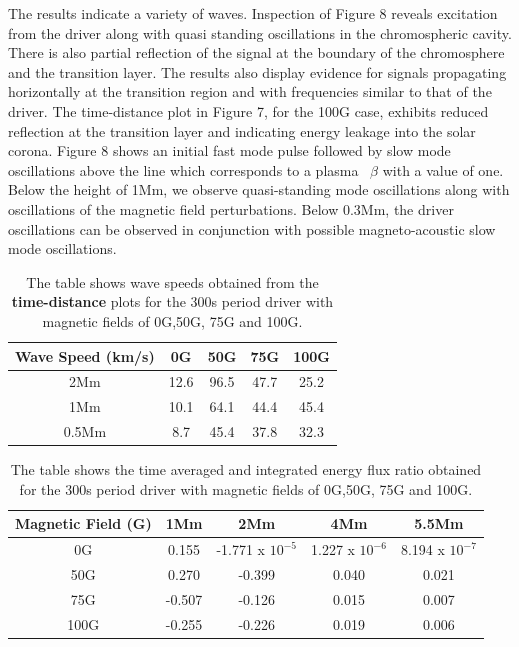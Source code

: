 \documentclass[physics,article,submit,pdftex,moreauthors]{Definitions/mdpi}
\begin{document}
The results indicate a variety of waves. Inspection of Figure 8 reveals excitation from the driver along with quasi standing oscillations in the chromospheric cavity. There is also partial reflection of the signal at the boundary of the chromosphere and the transition layer. The results also display evidence for signals propagating horizontally at the transition region and with frequencies similar to that of the driver. The time-distance plot in Figure 7, for the 100G case, exhibits reduced reflection at the transition layer and indicating energy leakage into the solar corona. Figure 8 shows an initial fast mode pulse followed by slow mode oscillations above the line which corresponds to a plasma ~$\beta$ with a value of one. Below the height of 1Mm, we observe quasi-standing mode oscillations along with oscillations of the magnetic field perturbations. Below 0.3Mm, the driver oscillations can be observed in conjunction with possible magneto-acoustic slow mode oscillations.



\begin{table}\label{wavespeeds}
\centering
\begin{tabular}{c c c c c}
\hline
Wave Speed (km/s)   &  0G  &  50G &  75G & 100G\\
\hline
2Mm & 12.6  &   96.5       &   47.7      &  25.2     \\
\hline
1Mm & 10.1  &    64.1      &   44.4     &   45.4      \\
\hline
0.5Mm & 8.7  &   45.4      &   37.8      &   32.3    \\
\hline

\end{tabular} 
\caption{The table shows wave speeds obtained from the {\bf time-distance} plots for the 300s period driver with magnetic fields of 0G,50G, 75G and 100G.}
\label{Tablewavespeeds_300s}
\end{table}

\begin{table}\label{energyflux}
\centering
\begin{tabular}{c c c c c}
\hline
Magnetic Field (G)   &  1Mm  &  2Mm &  4Mm & 5.5Mm \\
\hline
0G & 0.155  &    -1.771 x $10^{-5}$      &   1.227 x $10^{-6}$     &   8.194 x $10^{-7}$      \\
\hline
50G & 0.270  &   -0.399       &   0.040      &  0.021     \\
\hline
75G & -0.507  &    -0.126      &   0.015     &   0.007      \\
\hline
100G & -0.255  &   -0.226      &   0.019      &   0.006    \\
\hline

\end{tabular} 
\caption{The table shows the time averaged and integrated energy flux ratio obtained  for the 300s period driver with magnetic fields of 0G,50G, 75G and 100G.}
\label{energyfluxratio}
\end{table}
\end{document}
